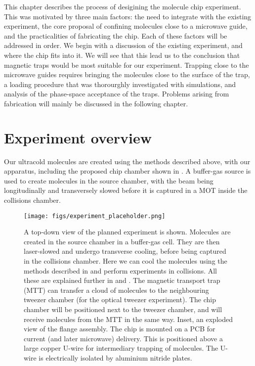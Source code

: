 This chapter describes the process of desigining the molecule chip experiment.
This was motivated by three main factors: the need to integrate with the
existing experiment, the core proposal of confining molecules close to a
microwave guide, and the practicalities of fabricating the chip.
%
Each of these factors will be addressed in order. We begin with a discussion of
the existing experiment, and where the chip fits into it. We will see that this
lead us to the conclusion that magnetic traps would be most suitable for our
experiment. Trapping close to the microwave guides requires bringing the
molecules close to the surface of the trap, a loading procedure that was
thorourghly investigated with simulations, and analysis of the phase-space
acceptance of the traps. Problems arising from fabrication will mainly be
discussed in the following chapter.

\section{Experiment overview}

Our ultracold molecules are created using the methods described above, with our
apparatus, including the proposed chip chamber shown in
. A buffer-gas source is used to create
\CaF{} molecules in the source chamber, with the beam being longitudinally and
transversely slowed before it is captured in a MOT inside the collisions
chamber.

\begin{figure}[htb]
  \centering
  \texttt{[image: figs/experiment\_placeholder.png]}
  \caption{
    A top-down view of the planned \CaF{} experiment is shown. Molecules are
    created in the source chamber in a buffer-gas cell. They are then
    laser-slowed  and undergo transverse
    cooling, before being captured in the collisions chamber.
    Here we can cool the
    molecules using the methods described in and perform
    experiments in collisions. All these are explained further in  and . The magnetic transport
    trap (MTT) can transfer a cloud of molecules to the neighbouring tweezer
    chamber (for the optical tweezer experiment). The chip chamber will be
    positioned next to the tweezer chamber, and will receive molecules from the
    MTT in the same way. Inset, an exploded view of the flange assembly. The
    chip is mounted on a PCB for current (and later microwave) delivery. This
    is positioned above a large copper U-wire for intermediary trapping of
    molecules. The U-wire is electrically isolated by aluminium nitride
    plates.}
  \label{design:fig:vacuumsystem}
\end{figure}

